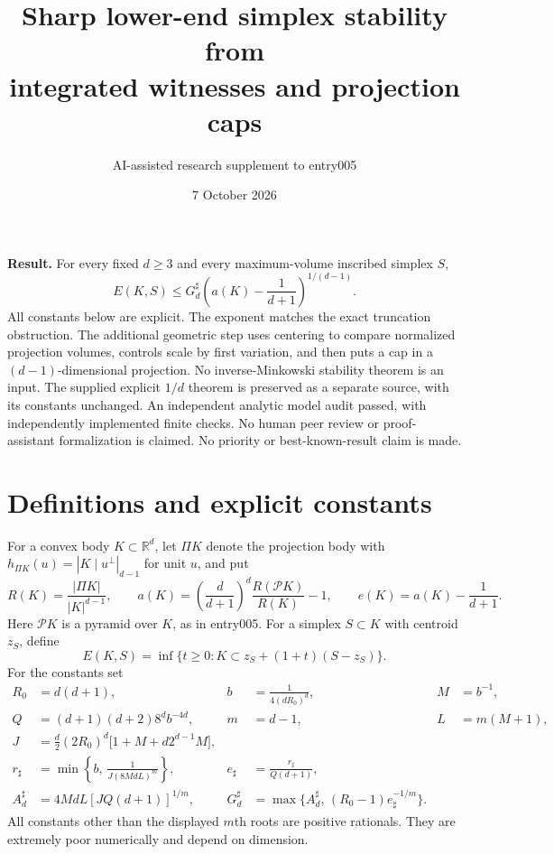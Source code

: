 \documentclass[11pt]{article}
\title{Sharp lower-end simplex stability from\\integrated witnesses and projection caps}
\author{AI-assisted research supplement to entry005}
\date{7 October 2026}
\begin{document}
\maketitle

\noindent\textbf{Result.}
For every fixed $d\ge3$ and every maximum-volume inscribed simplex $S$,
\[
 E(K,S)\le G_d^\sharp
 \left(a(K)-\frac1{d+1}\right)^{1/(d-1)}.
\]
All constants below are explicit. The exponent matches the exact truncation
obstruction. The additional geometric step uses centering to compare normalized
projection volumes, controls scale by first variation, and then puts a cap
in a $(d-1)$-dimensional projection. No inverse-Minkowski stability theorem
is an input. The supplied explicit $1/d$ theorem is preserved as a separate
source, with its constants unchanged. An independent analytic model audit
passed, with independently implemented finite checks. No human peer review
or proof-assistant formalization is claimed.
No priority or best-known-result claim is made.

\section{Definitions and explicit constants}

For a convex body $K\subset\mathbb R^d$, let $\Pi K$ denote the projection
body with $h_{\Pi K}(u)=|K\mid u^\perp|_{d-1}$ for unit $u$, and put
\[
 R(K)=\frac{|\Pi K|}{|K|^{d-1}},\qquad
 a(K)=\left(\frac d{d+1}\right)^d
       \frac{R(\mathcal P K)}{R(K)}-1,\qquad
 e(K)=a(K)-\frac1{d+1}.
\]
Here $\mathcal P K$ is a pyramid over $K$, as in entry005.
For a simplex $S\subset K$ with centroid $z_S$, define
\[
 E(K,S)=\inf\{t\ge0:K\subset z_S+(1+t)(S-z_S)\}.
\]
For the constants set
\begin{align}
 R_0&=d(d+1),&
 b&=\frac1{4(dR_0)^d},&
 M&=b^{-1},\label{eq:constants1}\\
 Q&=(d+1)(d+2)8^d b^{-4d},&
 m&=d-1,&
 L&=m(M+1),\label{eq:constants2}\\
 J&=\frac d2(2R_0)^d
       \bigl[1+M+d2^{d-1}M\bigr],\label{eq:J}\\
 r_\sharp&=\min\left\{b,\,
             \frac1{J(8MdL)^m}\right\},&
 e_\sharp&=\frac{r_\sharp}{Q(d+1)},\label{eq:gate}\\
 A_d^\sharp&=4MdL[JQ(d+1)]^{1/m},&
 G_d^\sharp&=\max\{A_d^\sharp,\,
                    (R_0-1)e_\sharp^{-1/m}\}.\label{eq:global}
\end{align}
All constants other than the displayed $m$th roots are positive rationals.
They are extremely poor numerically and depend on dimension.
\end{document}
